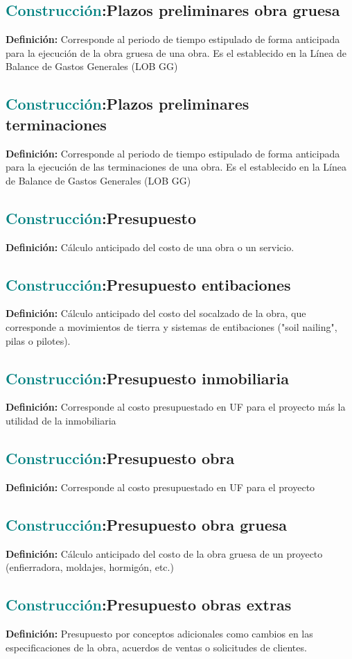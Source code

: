 \documentclass[12pt]{article}
\begin{document}
\subsection{\textcolor{teal}{Construcción}:{Plazos preliminares obra gruesa}}
\textbf{Definición:} Corresponde al periodo de tiempo estipulado de forma anticipada para la ejecución de la obra gruesa de una obra. Es el establecido en la Línea de Balance de Gastos Generales (LOB GG)
\subsection{\textcolor{teal}{Construcción}:{Plazos preliminares terminaciones}}
\textbf{Definición:} Corresponde al periodo de tiempo estipulado de forma anticipada para la ejecución de las terminaciones de una obra. Es el establecido en la Línea de Balance de Gastos Generales (LOB GG)
\subsection{\textcolor{teal}{Construcción}:{Presupuesto}}
\textbf{Definición:} Cálculo anticipado del costo de una obra o un servicio.
\subsection{\textcolor{teal}{Construcción}:{Presupuesto entibaciones}}
\textbf{Definición:} Cálculo anticipado del costo del socalzado de la obra, que corresponde a movimientos de tierra y sistemas de entibaciones ("soil nailing", pilas o pilotes).
\subsection{\textcolor{teal}{Construcción}:{Presupuesto inmobiliaria}}
\textbf{Definición:} Corresponde al costo presupuestado en UF para el proyecto más la utilidad de la inmobiliaria
\subsection{\textcolor{teal}{Construcción}:{Presupuesto obra}}
\textbf{Definición:} Corresponde al costo presupuestado en UF para el proyecto
\subsection{\textcolor{teal}{Construcción}:{Presupuesto obra gruesa}}
\textbf{Definición:} Cálculo anticipado del costo de la obra gruesa de un proyecto (enfierradora, moldajes, hormigón, etc.)
\subsection{\textcolor{teal}{Construcción}:{Presupuesto obras extras}}
\textbf{Definición:} Presupuesto por conceptos adicionales como cambios en las especificaciones de la obra, acuerdos de ventas o solicitudes de clientes.
\end{document}

